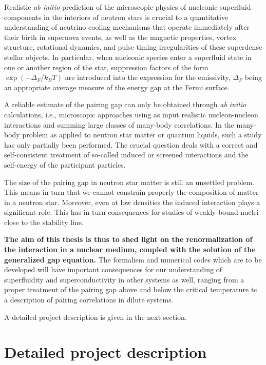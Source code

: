 \documentclass{svmult}
\begin{document}
Realistic {\it ab initio} prediction of the 
microscopic physics of nucleonic superfluid components in the interiors 
of neutron stars is crucial to a quantitative understanding of neutrino 
cooling mechanisms
that operate immediately after their birth 
in supernova events, as well as the magnetic properties, vortex structure, 
rotational dynamics, and pulse timing irregularities of these 
superdense stellar objects.  
In particular, when nucleonic species enter 
a superfluid state in one or another region of the star, suppression 
factors of the form $\exp (-\Delta_F /k_B T)$ are introduced 
into the expression for the emissivity, $\Delta_F$ being an appropriate 
average measure of the energy gap at the Fermi surface.  



A reliable estimate of the pairing gap can only be obtained through 
{\em ab initio} calculations, i.e., microscopic approaches using as input
realistic nucleon-nucleon interactions and summing large classes
of many-body correlations. 
In the many-body problem as applied to neutron star matter or quantum 
liquids, such a study has only partially been
performed. The crucial question deals with a correct and self-consistent 
treatment of 
so-called induced or screened interactions and the self-energy of the 
participant particles.

The size of the pairing gap in neutron star matter is still an unsettled 
problem. This means in turn that we cannot constrain properly the 
composition of matter in a neutron star. Moreover, even at low densities
the induced interaction plays a significant role. This has in turn
consequences for studies of weakly bound nuclei close to the 
stability line.

{\bf The aim of this thesis is thus to shed light on the renormalization
of the interaction in a nuclear medium, coupled with the solution
of the generalized gap equation.}
The formalism and numerical codes which are to  be developed will
have important consequences for our understanding of superfluidity
and superconductivity in other systems as well, ranging
from a proper treatment of the pairing gap above and below the
critical temperature to a description of pairing correlations in
dilute systems.


A detailed project description is given in the next section.

\section{Detailed project description}
\end{document}
